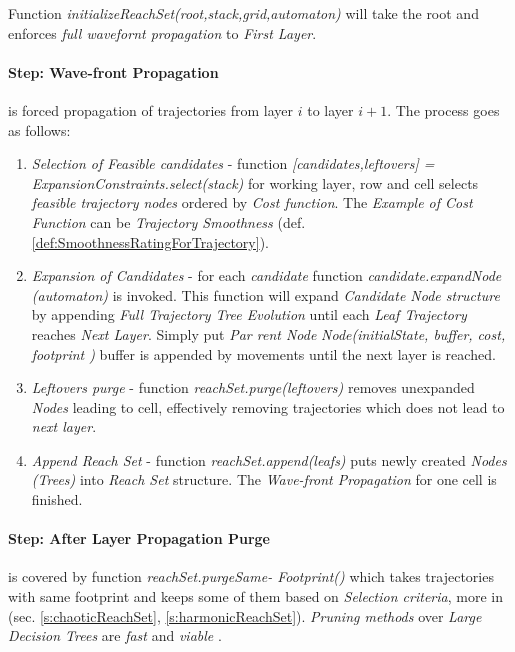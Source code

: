 \noindent Function \emph{initializeReachSet(root,stack,grid,automaton)} will take the root and enforces \emph{full wavefornt propagation} to \emph{First Layer}.


\paragraph{Step: Wave-front Propagation} is forced propagation of trajectories from layer $i$ to layer $i+1$. The process goes as follows:
\begin{enumerate}
    \item \emph{Selection of Feasible candidates} - function \emph{[candidates,leftovers] = ExpansionConstraints.select(stack)} for working layer, row and cell selects \emph{feasible trajectory nodes} ordered by \emph{Cost function}. The \emph{Example of Cost Function} can be \emph{Trajectory Smoothness} (def. \ref{def:SmoothnessRatingForTrajectory}).
    
    \item \emph{Expansion of Candidates} - for each \emph{candidate} function \emph{candidate.expandNode (automaton)} is invoked. This function will expand \emph{Candidate Node structure} by appending \emph{Full Trajectory Tree Evolution} until each \emph{Leaf Trajectory} reaches \emph{Next Layer}. Simply put \emph{Par rent Node} \emph{Node(initialState, buffer, cost, footprint )} buffer is appended by movements until the next layer is reached.
    
    \item \emph{Leftovers purge} - function \emph{reachSet.purge(leftovers)} removes unexpanded \emph{Nodes} leading to cell, effectively  removing trajectories which does not  lead to \emph{next layer}.
    
    \item \emph{Append Reach Set} - function \emph{reachSet.append(leafs)} puts newly created \emph{Nodes (Trees)} into \emph{Reach Set} structure. The \emph{Wave-front Propagation} for one cell is finished.
\end{enumerate}

\paragraph{Step: After Layer Propagation Purge} is covered by function \emph{reachSet.purgeSame- Footprint()} which takes trajectories with same footprint and keeps some of them based on \emph{Selection criteria}, more in (sec. \ref{s:chaoticReachSet}, \ref{s:harmonicReachSet}). \emph{Pruning methods} over \emph{Large Decision Trees} are \emph{fast} and \emph{viable} \cite{mingers1989empirical}.

